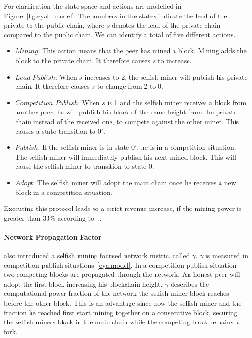 For clarification the state space and actions are modelled in Figure~\ref{fig:eyal_model}. The numbers in the states indicate the lead of the private to the public chain, where $s$ denotes the lead of the private chain compared to the public chain. We can identify a total of five different actions.
\begin{itemize}
\item $Mining$: This action means that the peer has mined a block. Mining adds the block to the private chain. It therefore causes $s$ to increase.
\item $Lead$ $Publish$: When $s$ increases to 2, the selfish miner will publish his private chain. It therefore causes $s$ to change from 2 to 0.
\item $Competition$ $Publish$: When $s$ is 1 and the selfish miner receives a block from another peer, he will publish his block of the same height from the private chain instead of the received one, to compete against the other miner. This causes a state transition to $0'$.
\item $Publish$: If the selfish miner is in state $0'$, he is in a competition situation.
The selfish miner will immediately publish his next mined block. This will cause the selfish miner to transition to state $0$.
\item $Adopt$: The selfish miner will adopt the main chain once he receives a new block in a competition situation.
\end{itemize}
Executing this protocol leads to a strict revenue increase, if the mining power is greater than $33\%$ according to \citeauthor{eyal}~\cite{eyal}.
\paragraph{Network Propagation Factor}\label{netpropfac}
 also introduced a selfish mining focused network metric, called $\gamma$. $\gamma$ is measured in competition publish situations~\ref{eyalmodel}. In a competition publish situation two competing blocks are propagated through the network. An honest peer will adopt the first block increasing his blockchain height. $\gamma$ describes the computational power fraction of the network the selfish miner block reaches before the other block. This is an advantage since now the selfish miner and the fraction he reached first start mining together on a consecutive block, securing the selfish miners block in the main chain while the competing block remains a fork.



